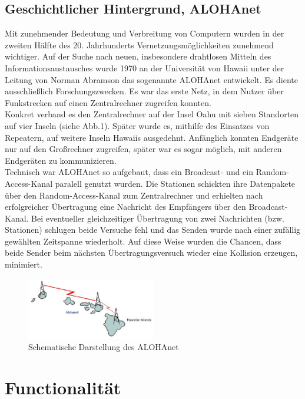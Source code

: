 \documentclass[a4paper,13pt]{scrartcl}
\begin{document}
\subsection{Geschichtlicher Hintergrund, ALOHAnet}
Mit zunehmender Bedeutung und Verbreitung von Computern wurden in der zweiten Hälfte des 20. Jahrhunderts Vernetzungsmöglichkeiten zunehmend wichtiger. Auf der Suche nach neuen, insbesondere drahtlosen Mitteln des Informationsaustausches wurde 1970 an der Universität von Hawaii unter der Leitung von Norman Abramson das sogenannte ALOHAnet entwickelt. Es diente ausschließlich Forschungszwecken. Es war das erste Netz, in dem Nutzer über Funkstrecken auf einen Zentralrechner zugreifen konnten.\\
Konkret verband es den Zentralrechner auf der Insel Oahu mit sieben Standorten auf vier Inseln (siehe Abb.1). Später wurde es, mithilfe des Einsatzes von Repeatern, auf weitere Inseln Hawaiis ausgedehnt. Anfänglich konnten Endgeräte nur auf den Großrechner zugreifen, später war es sogar möglich, mit anderen Endgeräten zu kommunizieren.\\
Technisch war ALOHAnet so aufgebaut, dass ein Broadcast- und ein Random-Access-Kanal paralell genutzt wurden. Die Stationen schickten ihre Datenpakete über den Random-Access-Kanal zum Zentralrechner und erhielten nach erfolgreicher Übertragung eine Nachricht des Empfängers über den Broadcast-Kanal. Bei eventueller gleichzeitiger Übertragung von zwei Nachrichten (bzw. Stationen) schlugen beide Versuche fehl und das Senden wurde nach einer zufällig gewählten Zeitspanne wiederholt. Auf diese Weise wurden die Chancen, dass beide Sender beim nächsten Übertragungsversuch wieder eine Kollision erzeugen, minimiert.

\begin{figure}[ht]
		\centering
	\includegraphics[width=0.5\textwidth]{alohanet.eps}
		\caption{Schematische Darstellung des ALOHAnet}
		\label{fig1}
\end{figure}
\clearpage

\section{Functionalität}
\end{document}
